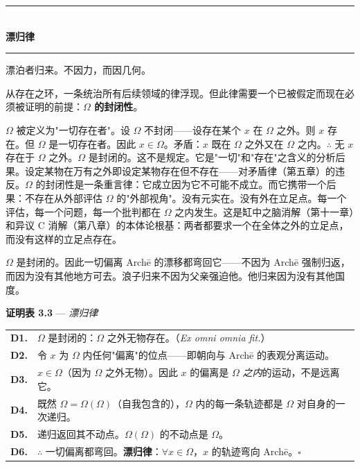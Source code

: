 \documentclass[10pt, openany, oneside]{book}
\renewcommand{\normalsize}{\fontsize{10}{13}\selectfont}
\renewcommand{\footnotesize}{\fontsize{8.5}{11}\selectfont}
\begin{document}
\vspace{1.5em}


\begin{center}
    \rule{0.3\textwidth}{0.4pt}\\[0.5em]
    {\normalsize\bfseries\scshape 漂归律}\\[0.3em]
    \rule{0.3\textwidth}{0.4pt}
\end{center}

\vspace{1em}

\noindent 漂泊者归来。不因力，而因几何。

从存在之环，一条统治所有后续领域的律浮现。但此律需要一个已被假定而现在必须被证明的前提：\textbf{$\Omega$ 的封闭性}。

$\Omega$ 被定义为"一切存在者"。设 $\Omega$ 不封闭——设存在某个 $x$ 在 $\Omega$ 之外。则 $x$ 存在。但 $\Omega$ 是一切存在者。因此 $x \in \Omega$。矛盾：$x$ 既在 $\Omega$ 之外又在 $\Omega$ 之内。$\therefore$ 无 $x$ 存在于 $\Omega$ 之外。$\Omega$ 是封闭的。这不是规定。它是"一切"和"存在"之含义的分析后果。设定某物在万有之外即设定某物存在但不存在——对矛盾律（第五章）的违反。$\Omega$ 的封闭性是一条重言律：它成立因为它不可能不成立。而它携带一个后果：不存在从外部评估 $\Omega$ 的"外部视角"。没有元实在。没有外在立足点。每一个评估，每一个问题，每一个批判都在 $\Omega$ 之内发生。这是缸中之脑消解（第十一章）和异议 C 消解（第八章）的本体论根基：两者都要求一个在全体之外的立足点，而没有这样的立足点存在。

$\Omega$ 是封闭的。因此一切偏离 Arch\={e} 的漂移都弯回它——不因为 Arch\={e} 强制归返，而因为没有其他地方可去。浪子归来不因为父亲强迫他。他归来因为没有其他国度。

\vspace{0.5em}

\textbf{证明表 3.3} --- \textit{漂归律}

\vspace{0.5em}

{\footnotesize
\noindent\begin{tabular}{r p{}}
\textbf{D1.} & $\Omega$ 是封闭的：$\Omega$ 之外无物存在。（\textit{Ex omni omnia fit.}）\\[0.3em]
\textbf{D2.} & 令 $x$ 为 $\Omega$ 内任何"偏离"的位点——即朝向与 Arch\={e} 的表观分离运动。\\[0.3em]
\textbf{D3.} & $x \in \Omega$（因为 $\Omega$ 之外无物）。因此 $x$ 的偏离是 $\Omega$ \textit{之内}的运动，不是远离它。\\[0.3em]
\textbf{D4.} & 既然 $\Omega = \Omega(\Omega)$（自我包含的），$\Omega$ 内的每一条轨迹都是 $\Omega$ 对自身的一次递归。\\[0.3em]
\textbf{D5.} & 递归返回其不动点。$\Omega(\Omega)$ 的不动点是 $\Omega$。\\[0.3em]
\textbf{D6.} & $\therefore$ 一切偏离都弯回。\textbf{漂归律}：$\forall x \in \Omega$，$x$ 的轨迹弯向 Arch\={e}。$\square$ \\[0.3em]
\end{tabular}
}
\end{document}

